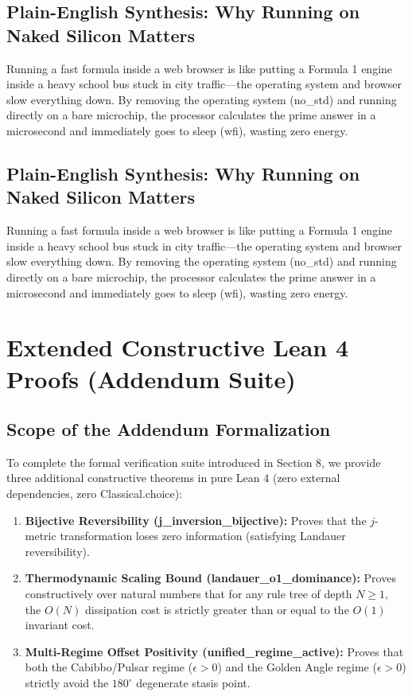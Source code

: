 \documentclass[11pt,a4paper,oneside]{article}
\def\texttt#1{#1}%
\theoremstyle{definition}
\begin{document}
\subsection{Plain-English Synthesis: Why Running on Naked Silicon Matters}
\begin{noobbox}
Running a fast formula inside a web browser is like putting a Formula 1 engine inside a heavy school bus stuck in city traffic---the operating system and browser slow everything down. By removing the operating system (\texttt{no\_std}) and running directly on a bare microchip, the processor calculates the prime answer in a microsecond and immediately goes to sleep (\texttt{wfi}), wasting zero energy.
\end{noobbox}
\subsection{Plain-English Synthesis: Why Running on Naked Silicon Matters}
\begin{noobbox}
Running a fast formula inside a web browser is like putting a Formula 1 engine inside a heavy school bus stuck in city traffic—the operating system and browser slow everything down. By removing the operating system (\texttt{no\_std}) and running directly on a bare microchip, the processor calculates the prime answer in a microsecond and immediately goes to sleep (\texttt{wfi}), wasting zero energy.
\end{noobbox}
\section{Extended Constructive Lean 4 Proofs (Addendum Suite)}

\subsection{Scope of the Addendum Formalization}
To complete the formal verification suite introduced in Section 8, we provide three additional constructive theorems in pure Lean 4 (zero external dependencies, zero \texttt{Classical.choice}):
\begin{enumerate}
    \item \textbf{Bijective Reversibility (\texttt{j\_inversion\_bijective}):} Proves that the $j$-metric transformation loses zero information (satisfying Landauer reversibility).
    \item \textbf{Thermodynamic Scaling Bound (\texttt{landauer\_o1\_dominance}):} Proves constructively over natural numbers that for any rule tree of depth $N \ge 1$, the $O(N)$ dissipation cost is strictly greater than or equal to the $O(1)$ invariant cost.
    \item \textbf{Multi-Regime Offset Positivity (\texttt{unified\_regime\_active}):} Proves that both the Cabibbo/Pulsar regime ($\epsilon > 0$) and the Golden Angle regime ($\epsilon > 0$) strictly avoid the $180^\circ$ degenerate stasis point.
\end{enumerate}
\end{document}
